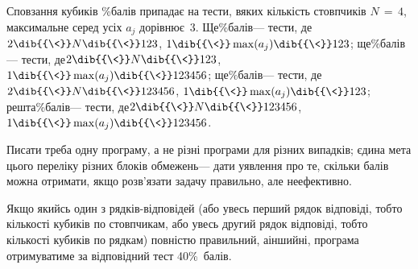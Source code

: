 \begin{problemAllDefault}{Сповзання кубиків}
\%\nolinebreak[3] балів припадає на тести, в\nolinebreak[3] яких кількість стовпчиків ${N\,{=}\,4}$, максимальне серед усіх $a_j$ дорівнює~3. 
Ще\%\nolinebreak[3] балів\nolinebreak[3] --- тести, де\nolinebreak[1] $2\dib{{\<}}N\dib{{\<}}123$, $1\dib{{\<}}\max(a_j)\dib{{\<}}123$; 
ще\%\nolinebreak[3] балів\nolinebreak[3] --- тести, де\nolinebreak[1] $2\dib{{\<}}N\dib{{\<}}123$, $1\dib{{\<}}\max(a_j)\dib{{\<}}123456$; 
ще\%\nolinebreak[3] балів\nolinebreak[3] --- тести, де\nolinebreak[1] $2\dib{{\<}}N\dib{{\<}}123456$, $1\dib{{\<}}\max(a_j)\dib{{\<}}123$; 
решта\%\nolinebreak[3] балів\nolinebreak[3] --- тести, де\nolinebreak[1] $2\dib{{\<}}N\dib{{\<}}123456$, $1\dib{{\<}}\max(a_j)\dib{{\<}}123456$.

Писати треба одну програму, а не різні програми для різних випадків; єдина мета цього переліку різних блоків обмежень\nolinebreak[3] --- дати уявлення про те, скільки балів можна отримати, якщо розв’язати задачу правильно, але не\nolinebreak[3] ефективно.

Якщо якийсь один з рядків-відповідей (або увесь перший рядок відповіді, тобто кількості кубиків по стовпчикам, або увесь другий рядок відповіді, тобто кількості кубиків по рядкам) повністю правильний, а\nolinebreak[3] інший\nolinebreak[3] ні, програма отримуватиме за відповідний тест 40\%~балів.




\end{problemAllDefault}